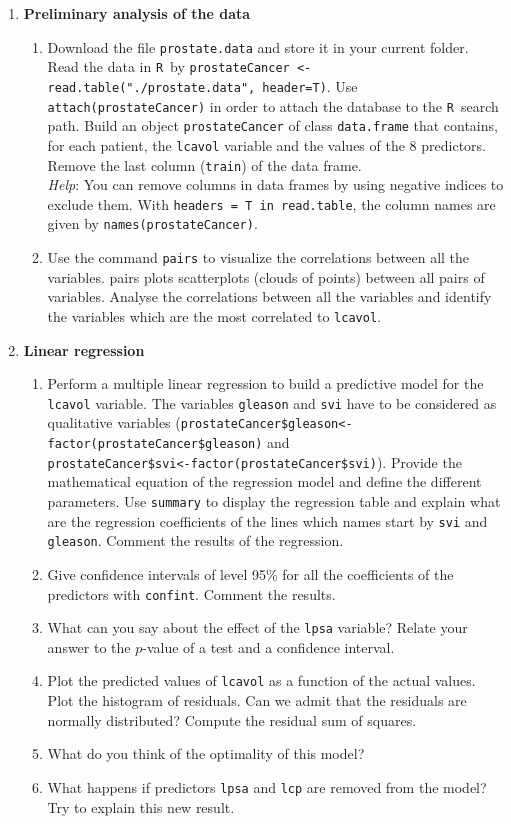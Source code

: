 \documentclass[12pt,a4paper]{article}
\newcommand{\R}{\texttt{R}~}
\newcommand{\code}[1]{\texttt{#1}}
\begin{document}
\begin{enumerate}
\item \textbf{Preliminary analysis of the data}
\begin{enumerate}
\item Download the file \code{prostate.data} and store it in your current folder. Read the data in \R by \code{prostateCancer <- read.table("./prostate.data", header=T)}. Use \code{attach(prostateCancer)} in order to attach the database to the \R search path. Build an object \code{prostateCancer} of class \code{data.frame} that contains, for each patient, the \code{lcavol} variable and the values of the 8 predictors. Remove the last column (\code{train}) of the data frame.\\
\textit{Help}: You can remove columns in data frames by using negative indices to exclude them. With \code{headers = T in read.table}, the column names are given by \code{names(prostateCancer)}.
\item Use the command \code{pairs} to visualize the correlations between all the variables. pairs plots scatterplots (clouds of points) between all pairs of variables. Analyse the correlations between all the variables and identify the variables which are the most correlated to \code{lcavol}.
\end{enumerate}
\pagebreak
\item \textbf{Linear regression}
\begin{enumerate}
\item Perform a multiple linear regression to build a predictive model for the \code{lcavol} variable. The variables \code{gleason} and \code{svi} have to be considered as qualitative variables (\code{prostateCancer\$gleason<-factor(prostateCancer\$gleason)} and \\\code{prostateCancer\$svi<-factor(prostateCancer\$svi)}). Provide the mathematical equation of the regression model and define the different parameters. Use \code{summary} to display the regression table and explain what are the regression coefficients of the lines which names start by \code{svi} and \code{gleason}. Comment the results of the regression.
\item Give confidence intervals of level 95\% for all the coefficients of the predictors with \code{confint}. Comment the results.
\item What can you say about the effect of the \code{lpsa} variable? Relate your answer to the $p$-value of a test and a confidence interval.
\item Plot the predicted values of \code{lcavol} as a function of the actual values. Plot the histogram of residuals. Can we admit that the residuals are normally distributed? Compute the residual sum of squares.
\item What do you think of the optimality of this model?
\item What happens if predictors \code{lpsa} and \code{lcp} are removed from the model? Try to explain this new result.
\end{enumerate}


\end{enumerate}
\end{document}
